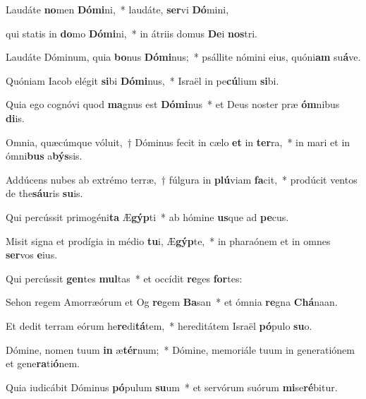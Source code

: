 \item Laudáte \textbf{no}men \textbf{Dó}\textbf{mi}ni,~* laudáte, \textbf{ser}vi \textbf{Dó}mini,

\item qui statis in \textbf{do}mo \textbf{Dó}\textbf{mi}ni,~* in átriis domus \textbf{De}i \textbf{nos}tri.

\item Laudáte Dóminum, quia \textbf{bo}nus \textbf{Dó}\textbf{mi}nus;~* psállite nómini eius, quóni\textbf{am} su\textbf{á}ve.

\item Quóniam Iacob elégit \textbf{si}bi \textbf{Dó}\textbf{mi}nus,~* Israël in pe\textbf{cú}lium \textbf{si}bi.

\item Quia ego cognóvi quod \textbf{ma}gnus est \textbf{Dó}\textbf{mi}nus~* et Deus noster præ \textbf{óm}nibus \textbf{di}is.

\item Omnia, quæcúmque vóluit,~† Dóminus fecit in cælo \textbf{et} in \textbf{ter}ra,~* in mari et in ómni\textbf{bus} a\textbf{býs}sis.

\item Addúcens nubes ab extrémo terræ,~† fúlgura in \textbf{plú}viam \textbf{fa}cit,~* prodúcit ventos de the\textbf{sáu}ris \textbf{su}is.

\item Qui percússit primogéni\textbf{ta} Æ\textbf{gýp}ti~* ab hómine \textbf{us}que ad \textbf{pe}cus.

\item Misit signa et prodígia in médio \textbf{tu}i, Æ\textbf{gýp}te,~* in pharaónem et in omnes \textbf{ser}vos \textbf{e}ius.

\item Qui percússit \textbf{gen}tes \textbf{mul}tas~* et occídit \textbf{re}ges \textbf{for}tes:

\item Sehon regem Amorræórum et Og \textbf{re}gem \textbf{Ba}san~* et ómnia \textbf{re}gna \textbf{Chá}naan.

\item Et dedit terram eórum he\textbf{re}di\textbf{tá}tem,~* hereditátem Israël \textbf{pó}pulo \textbf{su}o.

\item Dómine, nomen tuum \textbf{in} æ\textbf{tér}num;~* Dómine, memoriále tuum in generatiónem et gene\textbf{ra}ti\textbf{ó}nem.

\item Quia iudicábit Dóminus \textbf{pó}pulum \textbf{su}um~* et servórum suórum \textbf{mi}se\textbf{ré}bitur.


